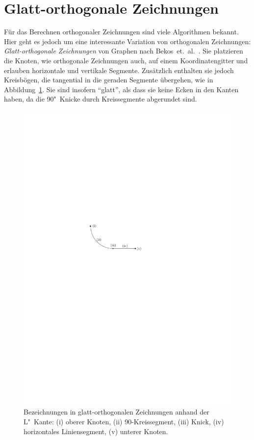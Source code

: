 \documentclass[a4paper]{scrreprt}
\theoremstyle{definition}
\begin{document}

\section{Glatt-orthogonale Zeichnungen}
\label{sec:smooth_definition}

Für das Berechnen orthogonaler Zeichnungen sind viele Algorithmen bekannt. Hier geht es jedoch um eine interessante Variation von orthogonalen Zeichnungen: \emph{Glatt-orthogonale Zeichnungen} von Graphen nach Bekos~et.~al.~\cite{bekos-13}. Sie platzieren die Knoten, wie orthogonale Zeichnungen auch, auf einem Koordinatengitter und erlauben horizontale und vertikale Segmente. Zusätzlich enthalten sie jedoch Kreisbögen, die tangential in die geraden Segmente übergehen, wie in Abbildung~\ref{fig:anatomieLKante}. Sie sind insofern "`glatt"', als dass sie keine Ecken in den Kanten haben, da die 90\textdegree"~Knicke durch Kreissegmente abgerundet sind.

\begin{figure}[h]
  \centering
  \includegraphics{anatomieLKante}
  \caption{Bezeichnungen in glatt-orthogonalen Zeichnungen anhand der L"~Kante: (i) oberer Knoten, (ii) 90\textdegree-Kreissegment, (iii) Knick, (iv) horizontales Liniensegment, (v) unterer Knoten.}
  \label{fig:anatomieLKante}
\end{figure}
\end{document}
